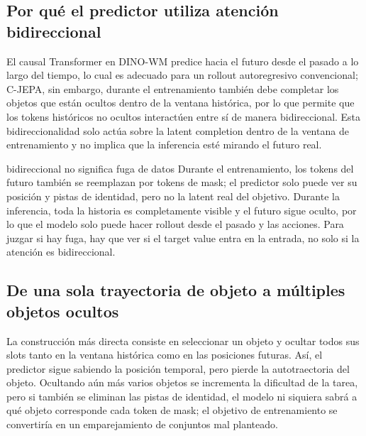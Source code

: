 \subsection{Por qué el predictor utiliza atención bidireccional}

El causal Transformer en DINO-WM predice hacia el futuro desde el pasado a lo largo del tiempo, lo cual es adecuado para un rollout autoregresivo convencional; C-JEPA, sin embargo, durante el entrenamiento también debe completar los objetos que están ocultos dentro de la ventana histórica, por lo que permite que los tokens históricos no ocultos interactúen entre sí de manera bidireccional. Esta bidireccionalidad solo actúa sobre la latent completion dentro de la ventana de entrenamiento y no implica que la inferencia esté mirando el futuro real.


\begin{warningbox}{bidireccional no significa fuga de datos}
Durante el entrenamiento, los tokens del futuro también se reemplazan por tokens de mask; el predictor solo puede ver su posición y pistas de identidad, pero no la latent real del objetivo. Durante la inferencia, toda la historia es completamente visible y el futuro sigue oculto, por lo que el modelo solo puede hacer rollout desde el pasado y las acciones. Para juzgar si hay fuga, hay que ver si el target value entra en la entrada, no solo si la atención es bidireccional.
\end{warningbox}

\subsection{De una sola trayectoria de objeto a múltiples objetos ocultos}

La construcción más directa consiste en seleccionar un objeto y ocultar todos sus slots tanto en la ventana histórica como en las posiciones futuras. Así, el predictor sigue sabiendo la posición temporal, pero pierde la autotraectoria del objeto. Ocultando aún más varios objetos se incrementa la dificultad de la tarea, pero si también se eliminan las pistas de identidad, el modelo ni siquiera sabrá a qué objeto corresponde cada token de mask; el objetivo de entrenamiento se convertiría en un emparejamiento de conjuntos mal planteado.


